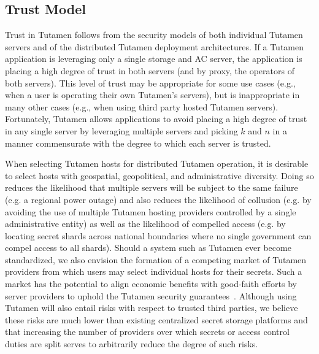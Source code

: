 \subsection{Trust Model}

Trust in Tutamen follows from the security models of both individual
Tutamen servers and of the distributed Tutamen deployment
architectures. If a Tutamen application is leveraging only a single
storage and AC server, the application is placing a high degree of
trust in both servers (and by proxy, the operators of both
servers). This level of trust may be appropriate for some use cases
(e.g., when a user is operating their own Tutamen's servers), but is
inappropriate in many other cases (e.g., when using third party hosted
Tutamen servers). Fortunately, Tutamen allows applications to avoid
placing a high degree of trust in any single server by leveraging
multiple servers and picking $k$ and $n$ in a manner commensurate with
the degree to which each server is trusted.

When selecting Tutamen hosts for distributed Tutamen operation, it is
desirable to select hosts with geospatial, geopolitical, and
administrative diversity. Doing so reduces the likelihood that
multiple servers will be subject to the same failure (e.g. a regional
power outage) and also reduces the likelihood of collusion (e.g. by
avoiding the use of multiple Tutamen hosting providers controlled by a
single administrative entity) as well as the likelihood of compelled
access (e.g. by locating secret shards across national boundaries
where no single government can compel access to all shards). Should a
system such as Tutamen ever become standardized, we also envision the
formation of a competing market of Tutamen providers from which users
may select individual hosts for their secrets. Such a market has the
potential to align economic benefits with good-faith efforts by server
providers to uphold the Tutamen security
guarantees~\cite{sayler-phd}. Although using Tutamen will also entail
risks with respect to trusted third parties, we believe these risks
are much lower than existing centralized secret storage platforms and
that increasing the number of providers over which secrets or access
control duties are split serves to arbitrarily reduce the degree of
such risks.

